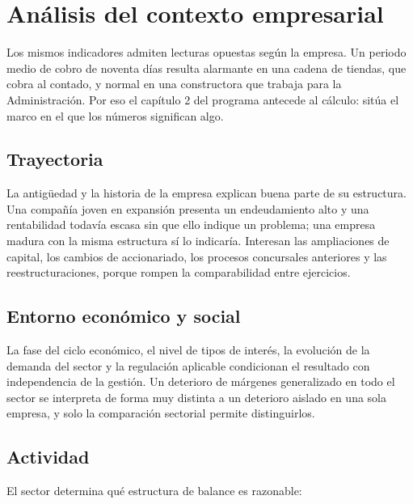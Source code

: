\documentclass[12pt]{book} %
\begin{document}
\hypertarget{anuxe1lisis-del-contexto-empresarial}{%
\section{Análisis del contexto
empresarial}\label{anuxe1lisis-del-contexto-empresarial}}

Los mismos indicadores admiten lecturas opuestas según la empresa. Un
periodo medio de cobro de noventa días resulta alarmante en una cadena
de tiendas, que cobra al contado, y normal en una constructora que
trabaja para la Administración. Por eso el capítulo 2 del programa
antecede al cálculo: sitúa el marco en el que los números significan
algo.

\hypertarget{trayectoria}{%
\subsection{Trayectoria}\label{trayectoria}}

La antigüedad y la historia de la empresa explican buena parte de su
estructura. Una compañía joven en expansión presenta un endeudamiento
alto y una rentabilidad todavía escasa sin que ello indique un problema;
una empresa madura con la misma estructura sí lo indicaría. Interesan
las ampliaciones de capital, los cambios de accionariado, los procesos
concursales anteriores y las reestructuraciones, porque rompen la
comparabilidad entre ejercicios.

\hypertarget{entorno-econuxf3mico-y-social}{%
\subsection{Entorno económico y
social}\label{entorno-econuxf3mico-y-social}}

La fase del ciclo económico, el nivel de tipos de interés, la evolución
de la demanda del sector y la regulación aplicable condicionan el
resultado con independencia de la gestión. Un deterioro de márgenes
generalizado en todo el sector se interpreta de forma muy distinta a un
deterioro aislado en una sola empresa, y solo la comparación sectorial
permite distinguirlos.

\hypertarget{actividad}{%
\subsection{Actividad}\label{actividad}}

El sector determina qué estructura de balance es razonable:
\end{document}
